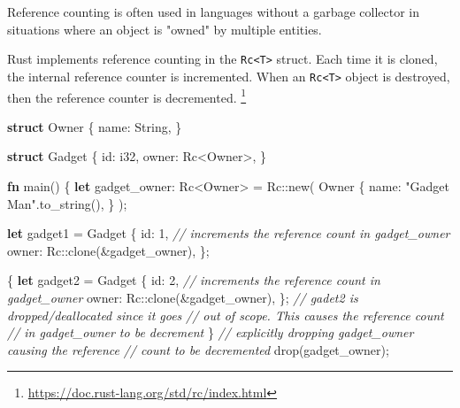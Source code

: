 \documentclass[
]{article}
\newenvironment{Shaded}{}{}
\newcommand{\CommentTok}[1]{\textcolor[rgb]{0.38,0.63,0.69}{\textit{#1}}}
\newcommand{\DataTypeTok}[1]{\textcolor[rgb]{0.56,0.13,0.00}{#1}}
\newcommand{\DecValTok}[1]{\textcolor[rgb]{0.25,0.63,0.44}{#1}}
\newcommand{\KeywordTok}[1]{\textcolor[rgb]{0.00,0.44,0.13}{\textbf{#1}}}
\newcommand{\NormalTok}[1]{#1}
\newcommand{\OperatorTok}[1]{\textcolor[rgb]{0.40,0.40,0.40}{#1}}
\newcommand{\PreprocessorTok}[1]{\textcolor[rgb]{0.74,0.48,0.00}{#1}}
\newcommand{\StringTok}[1]{\textcolor[rgb]{0.25,0.44,0.63}{#1}}
\begin{document}
Reference counting is often used in languages without a garbage
collector in situations where an object is "owned" by multiple entities.

Rust implements reference counting in the
\texttt{Rc\textless{}T\textgreater{}} struct. Each time it is cloned,
the internal reference counter is incremented. When an
\texttt{Rc\textless{}T\textgreater{}} object is destroyed, then the
reference counter is decremented. \footnote{\url{https://doc.rust-lang.org/std/rc/index.html}}

\begin{Shaded}
\begin{Highlighting}[]
\KeywordTok{struct}\NormalTok{ Owner }\OperatorTok{\{}
\NormalTok{    name}\OperatorTok{:} \DataTypeTok{String}\OperatorTok{,}
\OperatorTok{\}}

\KeywordTok{struct}\NormalTok{ Gadget }\OperatorTok{\{}
\NormalTok{    id}\OperatorTok{:} \DataTypeTok{i32}\OperatorTok{,}
\NormalTok{    owner}\OperatorTok{:}\NormalTok{ Rc}\OperatorTok{\textless{}}\NormalTok{Owner}\OperatorTok{\textgreater{},}
\OperatorTok{\}}

\KeywordTok{fn}\NormalTok{ main() }\OperatorTok{\{}
    \KeywordTok{let}\NormalTok{ gadget\_owner}\OperatorTok{:}\NormalTok{ Rc}\OperatorTok{\textless{}}\NormalTok{Owner}\OperatorTok{\textgreater{}} \OperatorTok{=} \PreprocessorTok{Rc::}\NormalTok{new(}
\NormalTok{        Owner }\OperatorTok{\{}
\NormalTok{            name}\OperatorTok{:} \StringTok{"Gadget Man"}\OperatorTok{.}\NormalTok{to\_string()}\OperatorTok{,}
        \OperatorTok{\}}
\NormalTok{    )}\OperatorTok{;}

    \KeywordTok{let}\NormalTok{ gadget1 }\OperatorTok{=}\NormalTok{ Gadget }\OperatorTok{\{}
\NormalTok{        id}\OperatorTok{:} \DecValTok{1}\OperatorTok{,}
        \CommentTok{// increments the reference count in gadget\_owner}
\NormalTok{        owner}\OperatorTok{:} \PreprocessorTok{Rc::}\NormalTok{clone(}\OperatorTok{\&}\NormalTok{gadget\_owner)}\OperatorTok{,} 
    \OperatorTok{\};}

    \OperatorTok{\{}
        \KeywordTok{let}\NormalTok{ gadget2 }\OperatorTok{=}\NormalTok{ Gadget }\OperatorTok{\{}
\NormalTok{            id}\OperatorTok{:} \DecValTok{2}\OperatorTok{,}
            \CommentTok{// increments the reference count in gadget\_owner}
\NormalTok{            owner}\OperatorTok{:} \PreprocessorTok{Rc::}\NormalTok{clone(}\OperatorTok{\&}\NormalTok{gadget\_owner)}\OperatorTok{,}
        \OperatorTok{\};}
        \CommentTok{// gadet2 is dropped/deallocated since it goes }
        \CommentTok{// out of scope. This causes the reference count}
        \CommentTok{// in gadget\_owner to be decrement}
    \OperatorTok{\}}
    \CommentTok{// explicitly dropping gadget\_owner causing the reference}
    \CommentTok{// count to be decremented}
\NormalTok{    drop(gadget\_owner)}\OperatorTok{;} 


\end{Highlighting}
\end{Shaded}
\end{document}
